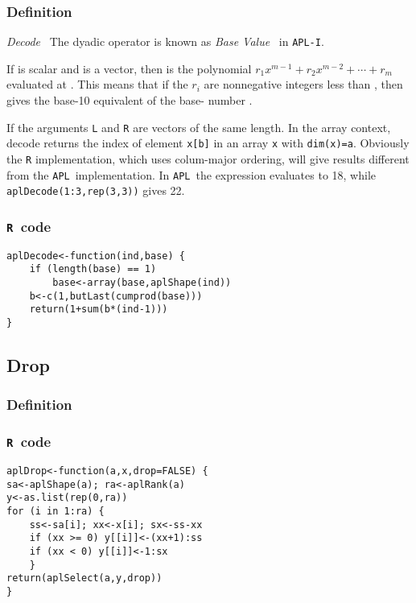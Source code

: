 \documentclass[11pt]{amsart}
\theoremstyle{plain}
\theoremstyle{definition}
\theoremstyle{remark}
\newcommand{\tR}{\texttt{R}}
\newcommand{\tA}{\texttt{APL}}
\newcommand{\tRc}[1]{\lstinline{#1}}
\newcommand{\tAc}[1]{{\apl{#1}}}
\begin{document}
\subsubsection{Definition}
\emph{Decode}~\citep[p. 94]{apl2_88} The dyadic operator \tAc{L\qdtack R} is known as \emph{Base Value}~\citep[p. 17-21]{helzer_89} in \texttt{APL-I}. 

If \tAc{L} is scalar and \tAc{R} is a vector, then \tAc{L\qdtack R} is the polynomial
\(r_1x^{m-1}+r_{2}x^{m-2}+\cdots+r_m\) evaluated at \tAc{L}. This means that if
the \(r_i\) are nonnegative integers less than \tAc{L}, then \tAc{L\qdtack R} gives the
base-10 equivalent of the base-\tAc{L} number \tAc{R}.

If the arguments \texttt{L} and \texttt{R} are vectors of the
same length. In the array context, decode returns the index of element \lstinline{x[b]} in an array
\lstinline{x} with \lstinline{dim(x)=a}. Obviously the \texttt{R} implementation, which uses
colum-major ordering, will give results different from the \tA\ implementation. In \tA\ 
the expression \tAc{3 3 3\qdtack 1 2 3} evaluates to 18, while \tRc{aplDecode(1:3,rep(3,3))} gives 22.
\subsubsection{\tR\ code}\quad
\begin{lstlisting}
aplDecode<-function(ind,base) {
    if (length(base) == 1) 
        base<-array(base,aplShape(ind))
    b<-c(1,butLast(cumprod(base)))
    return(1+sum(b*(ind-1)))
}
\end{lstlisting}
\subsubsection{}\quad

\subsection{Drop}\quad
\subsubsection{Definition}
\subsubsection{\tR\ code}\quad
\begin{lstlisting}
aplDrop<-function(a,x,drop=FALSE) {
sa<-aplShape(a); ra<-aplRank(a)
y<-as.list(rep(0,ra))
for (i in 1:ra) {
    ss<-sa[i]; xx<-x[i]; sx<-ss-xx
    if (xx >= 0) y[[i]]<-(xx+1):ss
    if (xx < 0) y[[i]]<-1:sx
    }
return(aplSelect(a,y,drop))
}
\end{lstlisting}
\end{document}
